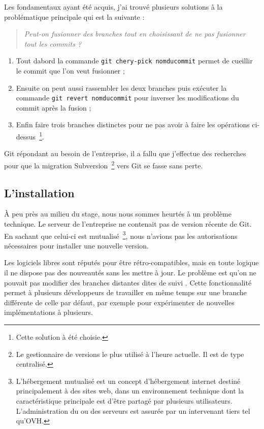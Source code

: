 Les fondamentaux ayant été acquis, j'ai trouvé plusieurs solutions à la
problématique principale qui est la suivante :

\begin{quote}
    \emph{Peut-on fusionner des branches tout en choisissant de ne pas
    fusionner tout les commits ?}
\end{quote}

\begin{enumerate}
    \item Tout dabord la commande \texttt{git chery-pick nomducommit}
    permet de \og cueillir \fg{} le commit que l'on veut fusionner ; \item
    Ensuite on peut aussi rassembler les deux branches puis exécuter la
    commande \texttt{git revert nomducommit} pour inverser les modifications
    du commit après la fusion ;
    \item Enfin faire trois branches distinctes pour ne pas avoir à
    faire les opérations ci-dessus\, \footnote{Cette solution à été
    choisie.}.
\end{enumerate}

Git répondant au besoin de l'entreprise, il a fallu que j'effectue des
recherches pour que la migration Subversion\, \footnote{Le gestionnaire
de versions le plus utilisé à l'heure actuelle. Il est de type
centralisé.} vers Git se fasse sans perte.

\subsection{L'installation} %
\label{sub:L'installation}

À peu près au milieu du stage, nous nous sommes heurtés à un problème
technique. Le serveur de l'entreprise ne contenait pas de version
récente de Git. En sachant que celui-ci est mutualisé\,
\footnote{L'hébergement mutualisé est un concept d'hébergement internet
destiné principalement à des sites web, dans un environnement technique
dont la caractéristique principale est d'être partagé par plusieurs
utilisateurs. L'administration du ou des serveurs est assurée par un
intervenant tiers tel qu'OVH.}, nous n'avions pas les autorisations
nécessaires pour installer une nouvelle version.

Les logiciels libres sont réputés pour être rétro-compatibles, mais en
toute logique il ne dispose pas des nouveautés sans les mettre à jour.
Le problème est qu'on ne pouvait pas modifier des branches distantes
dites \og de suivi \fg{}. Cette fonctionnalité permet à plusieurs
développeurs de travailler en même temps sur une branche différente de
celle par défaut, par exemple pour expérimenter de nouvelles
implémentations à plusieurs.

